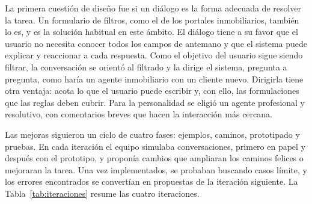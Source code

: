 \documentclass[10pt,a4paper]{article}
\begin{document}
La primera cuestión de diseño fue si un diálogo es la forma adecuada de resolver la tarea. Un formulario de filtros, como el de los portales inmobiliarios, también lo es, y es la solución habitual en este ámbito. El diálogo tiene a su favor que el usuario no necesita conocer todos los campos de antemano y que el sistema puede explicar y reaccionar a cada respuesta. Como el objetivo del usuario sigue siendo filtrar, la conversación se orientó al filtrado y la dirige el sistema, pregunta a pregunta, como haría un agente inmobiliario con un cliente nuevo. Dirigirla tiene otra ventaja: acota lo que el usuario puede escribir y, con ello, las formulaciones que las reglas deben cubrir. Para la personalidad se eligió un agente profesional y resolutivo, con comentarios breves que hacen la interacción más cercana.

Las mejoras siguieron un ciclo de cuatro fases: ejemplos, caminos, prototipado y pruebas. En cada iteración el equipo simulaba conversaciones, primero en papel y después con el prototipo, y proponía cambios que ampliaran los caminos felices o mejoraran la tarea. Una vez implementados, se probaban buscando casos límite, y los errores encontrados se convertían en propuestas de la iteración siguiente. La Tabla~\ref{tab:iteraciones} resume las cuatro iteraciones.
\end{document}
